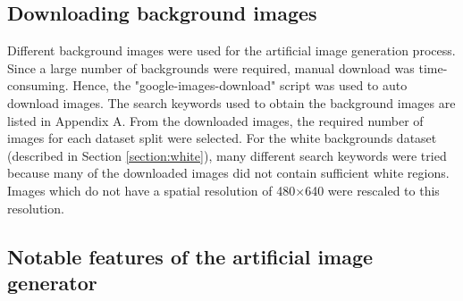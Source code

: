 \subsection{Downloading background images}
Different background images were used for the artificial image generation process. Since a large number of backgrounds were required, manual download was time-consuming. Hence, the "google-images-download" \cite{image_downloader} script was used to auto download images. The search keywords used to obtain the background images are listed in Appendix A. From the downloaded images, the required number of images for each dataset split were selected. For the white backgrounds dataset (described in Section \ref{section:white}), many different search keywords were tried because many of the downloaded images did not contain sufficient white regions. Images which do not have a spatial resolution of 480$\times$640 were rescaled to this resolution.

	
\subsection{Notable features of the artificial image generator}

